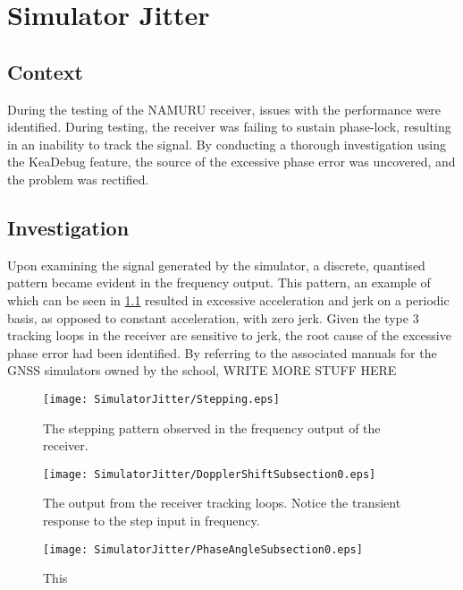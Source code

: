 \label{ch:SimJitter}
\chapter{Simulator Jitter}

\section{Context}
During the testing of the NAMURU receiver, issues with the performance were identified. During testing, the receiver was failing to sustain phase-lock, resulting in an inability to track the signal. By conducting a thorough investigation using the KeaDebug feature, the source of the excessive phase error was uncovered, and the problem was rectified. 

\section{Investigation}

Upon examining the signal generated by the simulator, a discrete, quantised pattern became evident in the frequency output. This pattern, an example of which can be seen in \ref{fig:Stepping} resulted in excessive acceleration and jerk on a periodic basis, as opposed to constant acceleration, with zero jerk. Given the type 3 tracking loops in the receiver are sensitive to jerk, the root cause of the excessive phase error had been identified. By referring to the associated manuals for the GNSS simulators owned by the school, WRITE MORE STUFF HERE 

\begin{figure}[!htb] 
    \centering
    \texttt{[image: SimulatorJitter/Stepping.eps]} 
    \caption{The stepping pattern observed in the frequency output of the receiver.}
    \label{fig:Stepping}
\end{figure}

\begin{figure}[!htb] 
    \centering
    \texttt{[image: SimulatorJitter/DopplerShiftSubsection0.eps]} 
    \caption{The output from the receiver tracking loops. Notice the transient response to the step input in frequency. }
    \label{fig:DopplerShiftSubsection0}
\end{figure}

\begin{figure}[!htb] 
    \centering
    \texttt{[image: SimulatorJitter/PhaseAngleSubsection0.eps]} 
    \caption{This }
    \label{fig:PhaseAngleSubsection0}
\end{figure}

